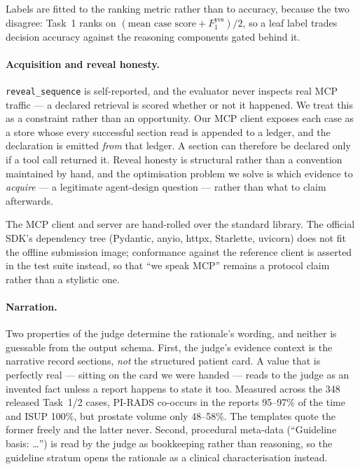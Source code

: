 \documentclass[runningheads]{llncs}
\newcommand{\code}[1]{\texttt{\small #1}}
\begin{document}
Labels are fitted to the ranking metric rather than to accuracy, because the two
disagree: Task~1 ranks on $(\text{mean case score} + F_1^{\text{yes}})/2$, so a leaf
label trades decision accuracy against the reasoning components gated behind it.

\paragraph{Acquisition and reveal honesty.}
\code{reveal\_sequence} is self-reported, and the evaluator never inspects real MCP
traffic --- a declared retrieval is scored whether or not it happened. We treat
this as a constraint rather than an opportunity. Our MCP client exposes each case
as a store whose every successful section read is appended to a ledger, and the
declaration is emitted \emph{from} that ledger. A section can therefore be declared
only if a tool call returned it. Reveal honesty is structural rather than a
convention maintained by hand, and the optimisation problem we solve is which
evidence to \emph{acquire} --- a legitimate agent-design question --- rather than
what to claim afterwards.

The MCP client and server are hand-rolled over the standard library. The official
SDK's dependency tree (Pydantic, anyio, httpx, Starlette, uvicorn) does not fit the
offline submission image; conformance against the reference client is asserted in
the test suite instead, so that ``we speak MCP'' remains a protocol claim rather
than a stylistic one.

\paragraph{Narration.}
Two properties of the judge determine the rationale's wording, and neither is
guessable from the output schema. First, the judge's evidence context is the
narrative record sections, \emph{not} the structured patient card. A value that is
perfectly real --- sitting on the card we were handed --- reads to the judge as an
invented fact unless a report happens to state it too. Measured across the 348
released Task~1/2 cases, PI-RADS co-occurs in the reports 95--97\% of the time and
ISUP 100\%, but prostate volume only 48--58\%. The templates quote the former
freely and the latter never. Second, procedural meta-data (``Guideline basis:
\ldots'') is read by the judge as bookkeeping rather than reasoning, so the
guideline stratum opens the rationale as a clinical characterisation instead.
\end{document}
